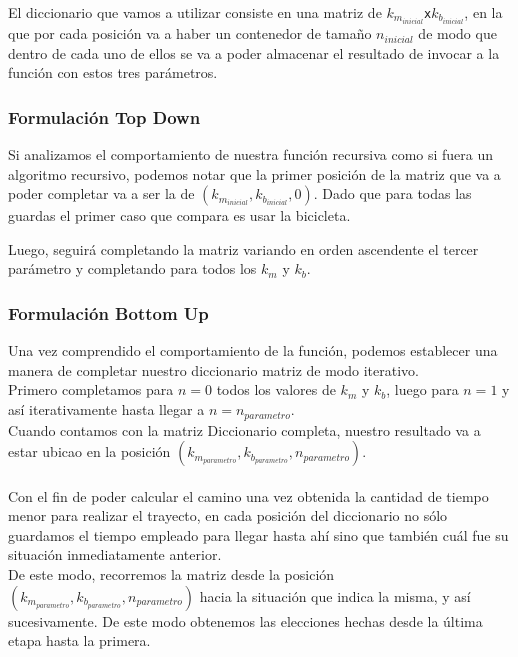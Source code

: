 El diccionario que vamos a utilizar consiste en una matriz de $k_{m_{inicial}}$\texttt{x}$k_{b_{inicial}}$, en la que por cada posici\'on va a haber un contenedor de tama\~no $n_{inicial}$ de modo que dentro de cada uno de ellos se va a poder almacenar el resultado de invocar a la funci\'on con estos tres par\'ametros.

\subsubsection*{Formulaci\'on Top Down}

 Si analizamos el comportamiento de nuestra funci\'on recursiva como si fuera un algoritmo recursivo, podemos notar que la primer posici\'on de la matriz que va a poder completar va a ser la de $(k_{m_{inicial}},k_{b_{inicial}},0)$. Dado que para todas las guardas el primer caso que compara es usar la bicicleta.
 
 Luego, seguir\'a completando la matriz variando en orden ascendente el tercer par\'ametro y completando para todos los $k_m$ y $k_b$.


\subsubsection*{Formulaci\'on Bottom Up}

Una vez comprendido el comportamiento de la funci\'on, podemos establecer una manera de completar nuestro diccionario matriz de modo iterativo.\\

Primero completamos para $n=0$ todos los valores de $k_m$ y $k_b$, luego para $n=1$ y as\'i iterativamente hasta llegar a $n=n_{parametro}$.\\

Cuando contamos con la matriz Diccionario completa, nuestro resultado va a estar ubicao en la posici\'on $(k_{m_{parametro}},k_{b_{parametro}},n_{parametro})$.\\
\\

Con el fin de poder calcular el camino una vez obtenida la cantidad de tiempo menor para realizar el trayecto, en cada posici\'on del diccionario no s\'olo guardamos el tiempo empleado para llegar hasta ah\'i sino que tambi\'en cu\'al fue su situaci\'on inmediatamente anterior.\\

De este modo, recorremos la matriz  desde la posici\'on $(k_{m_{parametro}},k_{b_{parametro}},n_{parametro})$ hacia la situaci\'on que indica la misma, y as\'i sucesivamente. De este modo obtenemos las elecciones hechas desde la \'ultima etapa hasta la primera.


